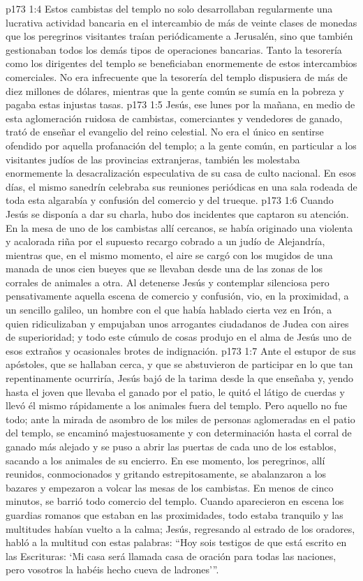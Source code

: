 \vs p173 1:4 Estos cambistas del templo no solo desarrollaban regularmente una lucrativa actividad bancaria en el intercambio de más de veinte clases de monedas que los peregrinos visitantes traían periódicamente a Jerusalén, sino que también gestionaban todos los demás tipos de operaciones bancarias. Tanto la tesorería como los dirigentes del templo se beneficiaban enormemente de estos intercambios comerciales. No era infrecuente que la tesorería del templo dispusiera de más de diez millones de dólares, mientras que la gente común se sumía en la pobreza y pagaba estas injustas tasas.
\vs p173 1:5 \pc Jesús, ese lunes por la mañana, en medio de esta aglomeración ruidosa de cambistas, comerciantes y vendedores de ganado, trató de enseñar el evangelio del reino celestial. No era el único en sentirse ofendido por aquella profanación del templo; a la gente común, en particular a los visitantes judíos de las provincias extranjeras, también les molestaba enormemente la desacralización especulativa de su casa de culto nacional. En esos días, el mismo sanedrín celebraba sus reuniones periódicas en una sala rodeada de toda esta algarabía y confusión del comercio y del trueque.
\vs p173 1:6 Cuando Jesús se disponía a dar su charla, hubo dos incidentes que captaron su atención. En la mesa de uno de los cambistas allí cercanos, se había originado una violenta y acalorada riña por el supuesto recargo cobrado a un judío de Alejandría, mientras que, en el mismo momento, el aire se cargó con los mugidos de una manada de unos cien bueyes que se llevaban desde una de las zonas de los corrales de animales a otra. Al detenerse Jesús y contemplar silenciosa pero pensativamente aquella escena de comercio y confusión, vio, en la proximidad, a un sencillo galileo, un hombre con el que había hablado cierta vez en Irón, a quien ridiculizaban y empujaban unos arrogantes ciudadanos de Judea con aires de superioridad; y todo este cúmulo de cosas produjo en el alma de Jesús uno de esos extraños y ocasionales brotes de indignación.
\vs p173 1:7 Ante el estupor de sus apóstoles, que se hallaban cerca, y que se abstuvieron de participar en lo que tan repentinamente ocurriría, Jesús bajó de la tarima desde la que enseñaba y, yendo hasta el joven que llevaba el ganado por el patio, le quitó el látigo de cuerdas y llevó él mismo rápidamente a los animales fuera del templo. Pero aquello no fue todo; ante la mirada de asombro de los miles de personas aglomeradas en el patio del templo, se encaminó majestuosamente y con determinación hasta el corral de ganado más alejado y se puso a abrir las puertas de cada uno de los establos, sacando a los animales de su encierro. En ese momento, los peregrinos, allí reunidos, conmocionados y gritando estrepitosamente, se abalanzaron a los bazares y empezaron a volcar las mesas de los cambistas. En menos de cinco minutos, se barrió todo comercio del templo. Cuando aparecieron en escena los guardias romanos que estaban en las proximidades, todo estaba tranquilo y las multitudes habían vuelto a la calma; Jesús, regresando al estrado de los oradores, habló a la multitud con estas palabras: “Hoy sois testigos de que está escrito en las Escrituras: ‘Mi casa será llamada casa de oración para todas las naciones, pero vosotros la habéis hecho cueva de ladrones’”.
